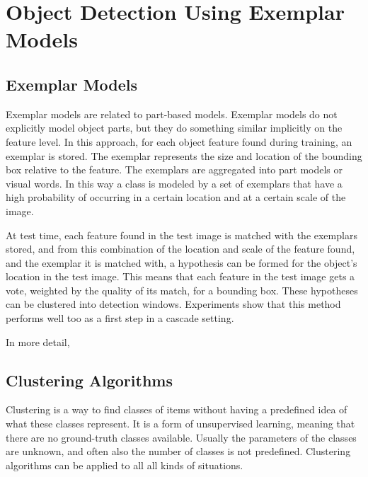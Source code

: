 \section{Object Detection Using Exemplar Models} %
\label{cha:object_detection}


\subsection{Exemplar Models} %
\label{sub:exemplar_models}

Exemplar models are related to part-based models.\cite{leibe2004combined, chum2007exemplar} Exemplar models do not explicitly model object parts, but they do something similar implicitly on the feature level. In this approach, for each object feature found during training, an exemplar is stored. The exemplar represents the size and location of the bounding box relative to the feature. The exemplars are aggregated into part models\cite{leibe2004combined} or visual words\cite{chum2007exemplar}. In this way a class is modeled by a set of exemplars that have a high probability of occurring in a certain location and at a certain scale of the image.

At test time, each feature found in the test image is matched with the exemplars stored, and from this combination of the location and scale of the feature found, and the exemplar it is matched with, a hypothesis can be formed for the object's location in the test image. This means that each feature in the test image gets a vote, weighted by the quality of its match, for a bounding box. These hypotheses can be clustered into detection windows. Experiments\cite{vedaldi2009multiple} show that this method performs well too as a first step in a cascade setting.

In more detail, 


\subsection{Clustering Algorithms} %
\label{sub:clustering_algorithms}

Clustering is a way to find classes of items without having a predefined idea of what these classes represent. It is a form of unsupervised learning, meaning that there are no ground-truth classes available. Usually the parameters of the classes are unknown, and often also the number of classes is not predefined. Clustering algorithms can be applied to all all kinds of situations.

